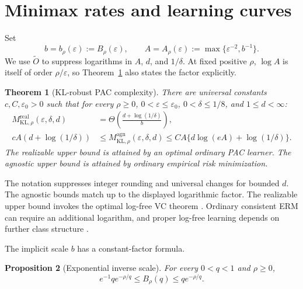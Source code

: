 \documentclass{article}
\newtheorem{theorem}{Theorem}
\newtheorem{proposition}[theorem]{Proposition}
\theoremstyle{remark}
\newcommand{\eps}{\varepsilon}
\begin{document}
\section{Minimax rates and learning curves}
\label{sec:rates}

Set
\begin{equation}
 b=b_\rho(\eps):=B_\rho(\eps),\qquad
 A=A_\rho(\eps):=\max\{\eps^{-2},b^{-1}\}.
 \label{eq:bA}
\end{equation}
We use $\widetilde O$ to suppress logarithms in $A$, $d$, and
$1/\delta$.  At fixed positive $\rho$, $\log A$ is itself of order
$\rho/\eps$, so Theorem~\ref{thm:main} also states the factor explicitly.

\begin{theorem}[KL-robust PAC complexity]
\label{thm:main}
There are universal constants $c,C,\eps_0>0$ such that for
every $\rho\ge0$, $0<\eps\le\eps_0$, $0<\delta\le1/8$, and
$1\le d<\infty$:
\begin{align}
 M^{\mathrm{real}}_{\mathrm{KL},\rho}(\eps,\delta,d)
 &=\Theta\!\left(\frac{d+\log(1/\delta)}{b}\right),
 \label{eq:real-rate}\\
 cA(d+\log(1/\delta))
 &\le M^{\mathrm{agn}}_{\mathrm{KL},\rho}(\eps,\delta,d)
 \le CA\{d\log(eA)+\log(1/\delta)\}.
 \label{eq:agn-rate}
\end{align}
The realizable upper bound is attained by an optimal ordinary PAC learner.
The agnostic upper bound is attained by ordinary empirical risk minimization.
\end{theorem}

The notation suppresses integer rounding and universal changes for bounded
$d$.  The agnostic bounds match up to the displayed logarithmic factor.  The
realizable upper bound invokes the optimal log-free VC theorem
\citep{hanneke2016optimal}.  Ordinary consistent ERM can require an additional
logarithm, and proper log-free learning depends on further class structure
\citep{bousquet2020proper}.

The implicit scale $b$ has a constant-factor formula.

\begin{proposition}[Exponential inverse scale]
\label{prop:inverse}
For every $0<q<1$ and $\rho\ge0$,
\begin{equation}
 e^{-1}q e^{-\rho/q}\le B_\rho(q)\le q e^{-\rho/q}.
 \label{eq:inverse-bound}
\end{equation}
\end{proposition}
\end{document}
